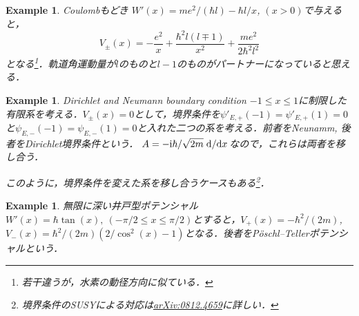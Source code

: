 \documentclass[english, dvipdfmx, a4paper]{jsarticle}
\theoremstyle{break}
\newtheorem{eg}[thm]{Example}
\renewcommand{\i}{\mathrm{i}}
\begin{document}
	\begin{eg}{Coulombもどき}
		$W'(x) = me^2/(\hbar l) - \hbar l/x$, $(x>0)$で与えると，
		\begin{equation}
			V_{\pm}(x) = -\frac{e^2}{x} + \frac{\hbar^2l(l\mp1)}{x^2} + \frac{me^2}{2\hbar^2l^2}
		\end{equation}
		となる\footnote{若干違うが，水素の動径方向に似ている．}．軌道角運動量が$l$のものと$l-1$のものがパートナーになっていると思える．
	\end{eg}

	\begin{eg}{Dirichlet and Neumann boundary condition}
		$-1 \leq x \leq 1$に制限した有限系を考える．$V_{\pm}(x) = 0$として，境界条件を$\psi'_{E, +}(-1) = \psi'_{E, +}(1) = 0$と$\psi_{E, -}(-1) = \psi_{E, -}(1) = 0$と入れた二つの系を考える．前者をNeunamm, 後者をDirichlet境界条件という．
		$A = -\i\hbar/\sqrt{2m}\dv*{}{x}$なので，これらは両者を移し合う．

		このように，境界条件を変えた系を移し合うケースもある\footnote{境界条件のSUSYによる対応は\href{https://arxiv.org/abs/0812.4659}{arXiv:0812.4659}に詳しい．}．
	\end{eg}

	\begin{eg}{無限に深い井戸型ポテンシャル}
		$W'(x) = \hbar\tan(x), \ (-\pi/2\leq x\leq \pi/2)$とすると，$V_+(x) = -\hbar^{2}/(2m)$, $V_-(x) = \hbar^2/(2m)(2/\cos^2(x) - 1)$となる．後者をP\"{o}schl--Tellerポテンシャルという．
	\end{eg}
	
\end{document}

